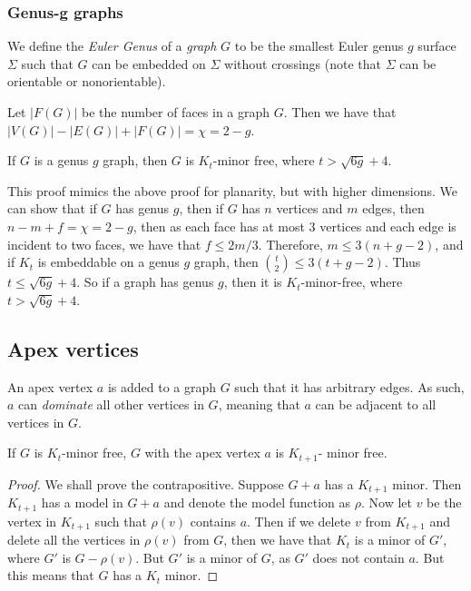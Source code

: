 \subsubsection{Genus-g graphs}\label{sssec:Graph_genus}

We define the \textit{Euler Genus} of a \textit{graph} \(G\) to be the smallest Euler genus \(g\) surface \(\Sigma\) such that \(G\) can be embedded on \(\Sigma\) without crossings (note that \(\Sigma\) can be orientable or nonorientable).

Let \(|F(G)|\) be the number of faces in a graph \(G\). Then we have that \(|V(G)| - |E(G)| + |F(G)| = \chi = 2 - g\). 

\begin{theorem}\label{thm:bounded_genus_kt_free}
	If \(G\) is a genus \(g\) graph, then \(G\) is \(K_t\)-minor free, where \(t > \sqrt{6g} + 4\). 
\end{theorem}
This proof mimics the above proof for planarity, but with higher dimensions. 
We can show that if \(G\) has genus \(g\), then if \(G\) has \(n\) vertices and \(m\) edges, then \(n - m + f = \chi = 2-g\), then as each face has at most 3 vertices and each edge is incident to two faces, we have that \(f \leq 2m/3\). Therefore, \(m \leq 3(n + g - 2)\), and if \(K_t\) is embeddable on a genus \(g\) graph, then \(\binom{t}{2} \leq 3 (t + g - 2)\). Thus \(t \leq \sqrt{6g} + 4\). So if a graph has genus \(g\), then it is \(K_t\)-minor-free, where \(t > \sqrt{6g} + 4\). 

\subsection{Apex vertices}\label{sssec:Apex_Vertices}
An apex vertex \(a\) is added to a graph \(G\) such that it has arbitrary edges. As such, \(a\) can \textit{dominate} all other vertices in \(G\), meaning that \(a\) can be adjacent to all vertices in \(G\). 
\begin{theorem}
	If \(G\) is \(K_t\)-minor free, \(G\) with the apex vertex \(a\) is \(K_{t+1}\)- minor free. 
\end{theorem}
\begin{proof}
	We shall prove the contrapositive. Suppose \(G + a\) has a \(K_{t + 1}\) minor. Then \(K_{t + 1}\) has a model in \(G + a\) and denote the model function as \(\rho\). Now let \(v\) be the vertex in \(K_{t + 1}\) such that \(\rho(v)\) contains \(a\). Then if we delete \(v\) from \(K_{t + 1}\) and delete all the vertices in \(\rho(v)\) from \(G\), then we have that \(K_t\) is a minor of \(G'\), where \(G'\) is \(G - \rho(v)\). But \(G'\) is a minor of \(G\), as \(G'\) does not contain \(a\). But this means that \(G\) has a \(K_t\) minor. 
\end{proof}
